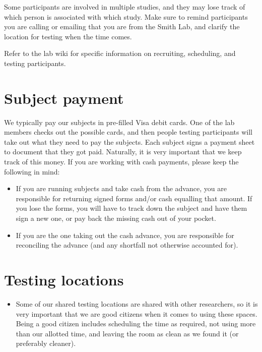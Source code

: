 \documentclass[letterpaper,12pt,oneside]{memoir}
\begin{document}
{Some participants are involved in multiple studies, and they may lose track of which person is associated with which study. Make sure to remind participants you are calling or emailing that you are from the Smith Lab, and clarify the location for testing when the time comes.

Refer to the lab wiki for specific information on recruiting, scheduling, and testing participants.


\section{Subject payment}
\label{sec:subject_payment}

We typically pay our subjects in pre-filled Visa debit cards. One of the lab members checks out the possible cards, and then people testing participants will take out what they need to pay the subjects. Each subject signs a payment sheet to document that they got paid. Naturally, it is very important that we keep track of this money. If you are working with cash payments, please keep the following in mind:

\begin{itemize}

\item If you are running subjects and take cash from the advance, you are responsible for returning signed forms and/or cash equalling that amount. If you lose the forms, you will have to track down the subject and have them sign a new one, or pay back the missing cash out of your pocket.

\item If you are the one taking out the cash advance, you are responsible for reconciling the advance (and any shortfall not otherwise accounted for).

\end{itemize}



\section{Testing locations}
\label{sec:testing_locations}

\begin{itemize}
\item Some of our shared testing locations are shared with other researchers, so it is very important that we are good citizens when it comes to using these spaces. Being a good citizen includes scheduling the time as required, not using more than our allotted time, and leaving the room as clean as we found it (or preferably cleaner).


\end{itemize}}
\end{document}
